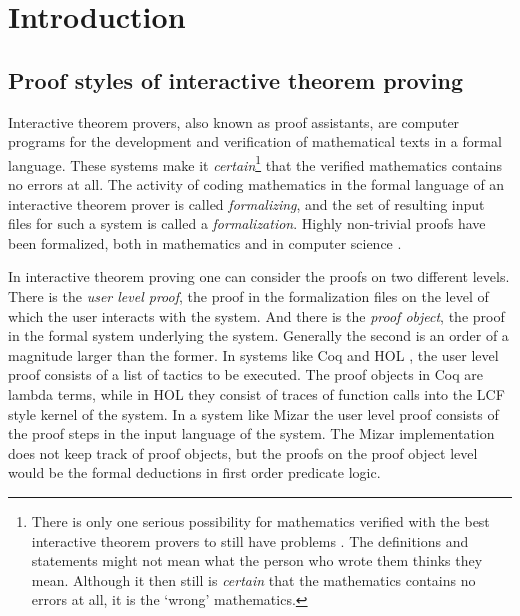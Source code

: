 \documentclass{LMCS}
\begin{document}
\maketitle

\section{Introduction}

\subsection{Proof styles of interactive theorem proving}\label{problem}

\noindent
Interactive theorem provers, also known as proof assistants,
are computer programs for the development and verification
of mathematical texts in a formal language.
These systems make
it \emph{certain}\footnote{
There is only one {serious} possibility for mathematics verified with the best interactive theorem provers to still
have problems \cite{pol:98,hal:11}.
The {definitions} and statements might not {mean} what the
person who wrote them thinks they mean.
Although it then still is \emph{certain} that the mathematics contains no errors at all, it is the `wrong'
mathematics.
}
that the verified mathematics contains no errors at all.
The activity of coding mathematics in the formal language of an interactive
theorem prover is called \emph{formalizing}, and the set of resulting input
files for such a system is called a \emph{formalization}.
Highly non-trivial proofs have been formalized, both in mathematics \cite{gon:06,har:08}
and in computer science \cite{fox:03,kle:09,ler:06}.

In interactive theorem proving one can consider the proofs on two different levels.
There is the \emph{user level proof}, the proof in the formalization files
on the level of which the user
interacts with the system.
And there is the \emph{proof object}, the proof in the formal system
underlying the system.
Generally the second is an order of a magnitude larger than the former.
In systems like Coq and HOL \cite{gor:mel:93}, the user level proof consists of
a list of tactics to be executed.
The proof objects in Coq are lambda terms, while in HOL they
consist of traces of function calls into the LCF style kernel of the system.
In a system like Mizar \cite{gra:kor:nau:10} the user level proof consists of
the proof steps in the input language of the system.
The Mizar implementation does not keep track of proof objects, but the proofs
on the proof object level
would be the formal deductions in first order predicate logic.
\end{document}
